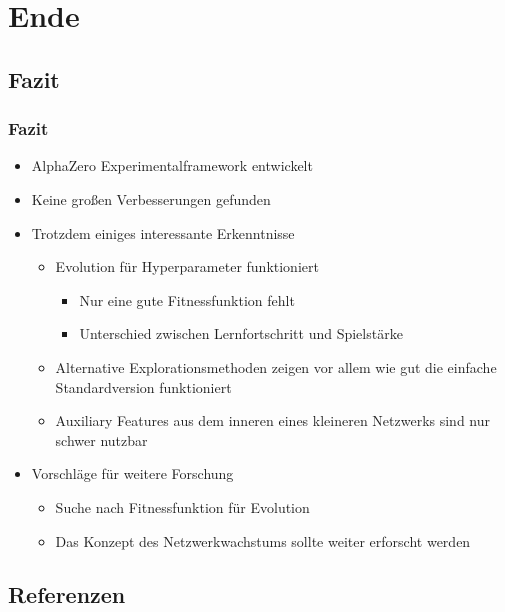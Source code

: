 \section{Ende}




\subsection{Fazit}



\begin{frame}
 \frametitle{Fazit}
  


\begin{itemize}
  \item \pause AlphaZero Experimentalframework entwickelt
  \item \pause Keine großen Verbesserungen gefunden
  \item \pause Trotzdem einiges interessante Erkenntnisse
\begin{itemize}
  \item \pause Evolution für Hyperparameter funktioniert
\begin{itemize}
  \item \pause Nur eine gute Fitnessfunktion fehlt
  \item \pause Unterschied zwischen Lernfortschritt und Spielstärke
\end{itemize}
  \item \pause Alternative Explorationsmethoden zeigen vor allem wie gut die einfache Standardversion funktioniert
  \item \pause Auxiliary Features aus dem inneren eines kleineren Netzwerks sind nur schwer nutzbar
\end{itemize}
  \item \pause Vorschläge für weitere Forschung
\begin{itemize}
  \item \pause Suche nach Fitnessfunktion für Evolution
  \item \pause Das Konzept des Netzwerkwachstums sollte weiter erforscht werden
\end{itemize}
\end{itemize}

  
\end{frame}

\subsection{Referenzen}



